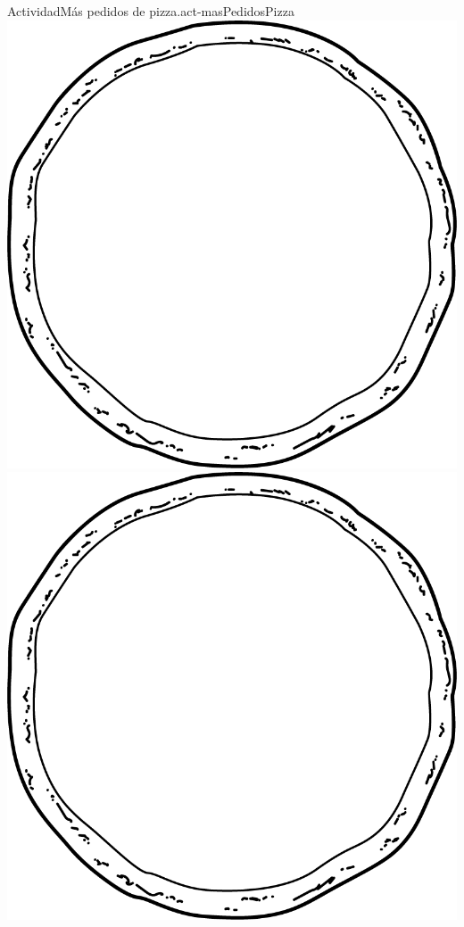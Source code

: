 \documentclass[20pt]{extarticle}
\begin{document}
\begin{activity}{Actividad}{Más pedidos de pizza.}{act-masPedidosPizza}
\newpage
\vspace*{2.5cm}
\includegraphics[width=\linewidth, center]{external/png-source/pizza-draw.png}
\newpage
\vspace*{2.5cm}
\includegraphics[width=\linewidth, center]{external/png-source/pizza-draw.png}
\end{activity}
\end{document}

